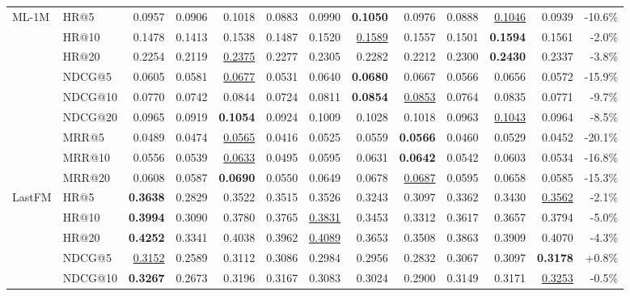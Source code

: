 \documentclass[sigconf,review,anonymous]{acmart}
\newcommand{\tblbest}[1]{\textbf{#1}}
\newcommand{\tblsecond}[1]{\underline{#1}}
\begin{document}
\begin{table}[t]
{\begin{tabular}{llrrrrrrrrrrr}
    \midrule
    \multirow{9}{*}{ML-1M}
      & HR@5    & 0.0957 & 0.0906 & 0.1018 & 0.0883 & 0.0990 & \tblbest{0.1050} & 0.0976 & 0.0888 & \tblsecond{0.1046} & 0.0939 & -10.6\% \\
      & HR@10   & 0.1478 & 0.1413 & 0.1538 & 0.1487 & 0.1520 & \tblsecond{0.1589} & 0.1557 & 0.1501 & \tblbest{0.1594} & 0.1561 & -2.0\% \\
      & HR@20   & 0.2254 & 0.2119 & \tblsecond{0.2375} & 0.2277 & 0.2305 & 0.2282 & 0.2212 & 0.2300 & \tblbest{0.2430} & 0.2337 & -3.8\% \\
      & NDCG@5  & 0.0605 & 0.0581 & \tblsecond{0.0677} & 0.0531 & 0.0640 & \tblbest{0.0680} & 0.0667 & 0.0566 & 0.0656 & 0.0572 & -15.9\% \\
      & NDCG@10 & 0.0770 & 0.0742 & 0.0844 & 0.0724 & 0.0811 & \tblbest{0.0854} & \tblsecond{0.0853} & 0.0764 & 0.0835 & 0.0771 & -9.7\% \\
      & NDCG@20 & 0.0965 & 0.0919 & \tblbest{0.1054} & 0.0924 & 0.1009 & 0.1028 & 0.1018 & 0.0963 & \tblsecond{0.1043} & 0.0964 & -8.5\% \\
      & MRR@5   & 0.0489 & 0.0474 & \tblsecond{0.0565} & 0.0416 & 0.0525 & 0.0559 & \tblbest{0.0566} & 0.0460 & 0.0529 & 0.0452 & -20.1\% \\
      & MRR@10  & 0.0556 & 0.0539 & \tblsecond{0.0633} & 0.0495 & 0.0595 & 0.0631 & \tblbest{0.0642} & 0.0542 & 0.0603 & 0.0534 & -16.8\% \\
      & MRR@20  & 0.0608 & 0.0587 & \tblbest{0.0690} & 0.0550 & 0.0649 & 0.0678 & \tblsecond{0.0687} & 0.0595 & 0.0658 & 0.0585 & -15.3\% \\
    \midrule
    \multirow{9}{*}{LastFM}
      & HR@5    & \tblbest{0.3638} & 0.2829 & 0.3522 & 0.3515 & 0.3526 & 0.3243 & 0.3097 & 0.3362 & 0.3430 & \tblsecond{0.3562} & -2.1\% \\
      & HR@10   & \tblbest{0.3994} & 0.3090 & 0.3780 & 0.3765 & \tblsecond{0.3831} & 0.3453 & 0.3312 & 0.3617 & 0.3657 & 0.3794 & -5.0\% \\
      & HR@20   & \tblbest{0.4252} & 0.3341 & 0.4038 & 0.3962 & \tblsecond{0.4089} & 0.3653 & 0.3508 & 0.3863 & 0.3909 & 0.4070 & -4.3\% \\
      & NDCG@5  & \tblsecond{0.3152} & 0.2589 & 0.3112 & 0.3086 & 0.2984 & 0.2956 & 0.2832 & 0.3067 & 0.3097 & \tblbest{0.3178} & +0.8\% \\
      & NDCG@10 & \tblbest{0.3267} & 0.2673 & 0.3196 & 0.3167 & 0.3083 & 0.3024 & 0.2900 & 0.3149 & 0.3171 & \tblsecond{0.3253} & -0.5\% \\

\end{tabular}}
\end{table}
\end{document}
